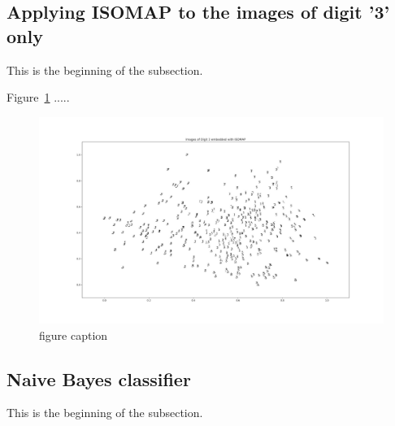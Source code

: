 \clearpage{}
\subsection{Applying ISOMAP to the images of digit '3' only}

This is the beginning of the subsection.

Figure~\ref{fig:fig10} .....
\begin{figure}[htb]
 \centering
\includegraphics[width=\textwidth]{assignment1/3-2-ISOMAPembedding.png}
\caption{\label{fig:fig10}figure caption}
\end{figure}

\clearpage{}
\subsection{Naive Bayes classifier}

This is the beginning of the subsection.

